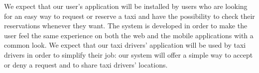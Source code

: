	We expect that our user's application will be installed by users who are looking for an easy way to request or reserve a taxi and have the possibility to check their reservations whenever they want.
	The system is developed in order to make the user feel the same experience on both the web and the mobile applications with a common look.
	\newline
	We expect that our taxi drivers' application will be used by taxi drivers in order to simplify their job: our system will offer a simple way to accept or deny a request and to share taxi drivers' locations.